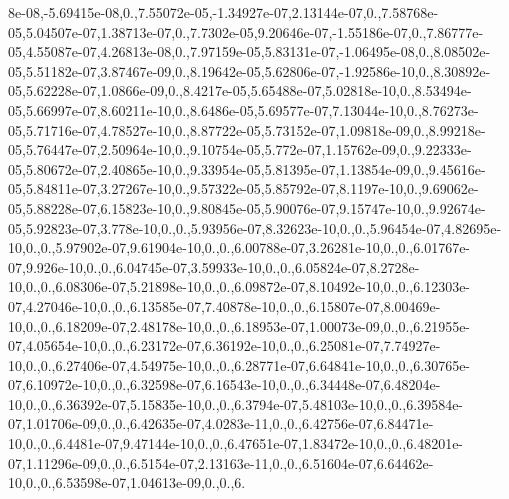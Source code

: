 {8e-\/08,-\/5.\-69415e-\/08,0.,7.\-55072e-\/05,-\/1.\-34927e-\/07,2.\-13144e-\/07,0.,7.\-58768e-\/05,5.\-04507e-\/07,1.\-38713e-\/07,0.,7.\-7302e-\/05,9.\-20646e-\/07,-\/1.\-55186e-\/07,0.,7.\-86777e-\/05,4.\-55087e-\/07,4.\-26813e-\/08,0.,7.\-97159e-\/05,5.\-83131e-\/07,-\/1.\-06495e-\/08,0.,8.\-08502e-\/05,5.\-51182e-\/07,3.\-87467e-\/09,0.,8.\-19642e-\/05,5.\-62806e-\/07,-\/1.\-92586e-\/10,0.,8.\-30892e-\/05,5.\-62228e-\/07,1.\-0866e-\/09,0.,8.\-4217e-\/05,5.\-65488e-\/07,5.\-02818e-\/10,0.,8.\-53494e-\/05,5.\-66997e-\/07,8.\-60211e-\/10,0.,8.\-6486e-\/05,5.\-69577e-\/07,7.\-13044e-\/10,0.,8.\-76273e-\/05,5.\-71716e-\/07,4.\-78527e-\/10,0.,8.\-87722e-\/05,5.\-73152e-\/07,1.\-09818e-\/09,0.,8.\-99218e-\/05,5.\-76447e-\/07,2.\-50964e-\/10,0.,9.\-10754e-\/05,5.\-772e-\/07,1.\-15762e-\/09,0.,9.\-22333e-\/05,5.\-80672e-\/07,2.\-40865e-\/10,0.,9.\-33954e-\/05,5.\-81395e-\/07,1.\-13854e-\/09,0.,9.\-45616e-\/05,5.\-84811e-\/07,3.\-27267e-\/10,0.,9.\-57322e-\/05,5.\-85792e-\/07,8.\-1197e-\/10,0.,9.\-69062e-\/05,5.\-88228e-\/07,6.\-15823e-\/10,0.,9.\-80845e-\/05,5.\-90076e-\/07,9.\-15747e-\/10,0.,9.\-92674e-\/05,5.\-92823e-\/07,3.\-778e-\/10,0.,0.,5.\-93956e-\/07,8.\-32623e-\/10,0.,0.,5.\-96454e-\/07,4.\-82695e-\/10,0.,0.,5.\-97902e-\/07,9.\-61904e-\/10,0.,0.,6.\-00788e-\/07,3.\-26281e-\/10,0.,0.,6.\-01767e-\/07,9.\-926e-\/10,0.,0.,6.\-04745e-\/07,3.\-59933e-\/10,0.,0.,6.\-05824e-\/07,8.\-2728e-\/10,0.,0.,6.\-08306e-\/07,5.\-21898e-\/10,0.,0.,6.\-09872e-\/07,8.\-10492e-\/10,0.,0.,6.\-12303e-\/07,4.\-27046e-\/10,0.,0.,6.\-13585e-\/07,7.\-40878e-\/10,0.,0.,6.\-15807e-\/07,8.\-00469e-\/10,0.,0.,6.\-18209e-\/07,2.\-48178e-\/10,0.,0.,6.\-18953e-\/07,1.\-00073e-\/09,0.,0.,6.\-21955e-\/07,4.\-05654e-\/10,0.,0.,6.\-23172e-\/07,6.\-36192e-\/10,0.,0.,6.\-25081e-\/07,7.\-74927e-\/10,0.,0.,6.\-27406e-\/07,4.\-54975e-\/10,0.,0.,6.\-28771e-\/07,6.\-64841e-\/10,0.,0.,6.\-30765e-\/07,6.\-10972e-\/10,0.,0.,6.\-32598e-\/07,6.\-16543e-\/10,0.,0.,6.\-34448e-\/07,6.\-48204e-\/10,0.,0.,6.\-36392e-\/07,5.\-15835e-\/10,0.,0.,6.\-3794e-\/07,5.\-48103e-\/10,0.,0.,6.\-39584e-\/07,1.\-01706e-\/09,0.,0.,6.\-42635e-\/07,4.\-0283e-\/11,0.,0.,6.\-42756e-\/07,6.\-84471e-\/10,0.,0.,6.\-4481e-\/07,9.\-47144e-\/10,0.,0.,6.\-47651e-\/07,1.\-83472e-\/10,0.,0.,6.\-48201e-\/07,1.\-11296e-\/09,0.,0.,6.\-5154e-\/07,2.\-13163e-\/11,0.,0.,6.\-51604e-\/07,6.\-64462e-\/10,0.,0.,6.\-53598e-\/07,1.\-04613e-\/09,0.,0.,6.\-}
